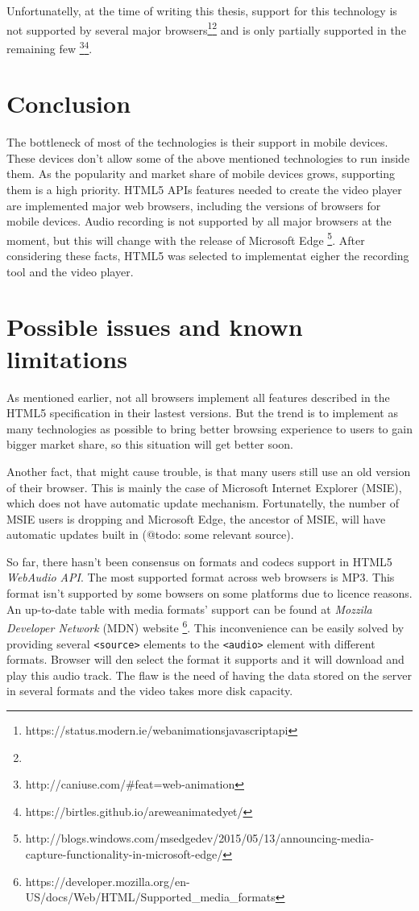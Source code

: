 Unfortunatelly, at the time of writing this thesis, support for this technology is not supported by several major browsers\footnote{https://status.modern.ie/webanimationsjavascriptapi}\footnote{} and is only partially supported in the remaining few \footnote{http://caniuse.com/\#feat=web-animation}\footnote{https://birtles.github.io/areweanimatedyet/}.

\section{Conclusion}
The bottleneck of most of the technologies is their support in mobile devices. These devices don't allow some of the above mentioned technologies to run inside them. As the popularity and market share of mobile devices grows, supporting them is a high priority. HTML5 APIs features needed to create the video player are implemented major web browsers, including the versions of browsers for mobile devices. Audio recording is not supported by all major browsers at the moment, but this will change with the release of Microsoft Edge \cite{}\footnote{http://blogs.windows.com/msedgedev/2015/05/13/announcing-media-capture-functionality-in-microsoft-edge/}. After considering these facts, HTML5 was selected to implementat eigher the recording tool and the video player.

\section{Possible issues and known limitations}
As mentioned earlier, not all browsers implement all features described in the HTML5 specification in their lastest versions. But the trend is to implement as many technologies as possible to bring better browsing experience to users to gain bigger market share, so this situation will get better soon.

Another fact, that might cause trouble, is that many users still use an old version of their browser. This is mainly the case of Microsoft Internet Explorer (MSIE), which does not have automatic update mechanism. Fortunatelly, the number of MSIE users is dropping and Microsoft Edge, the ancestor of MSIE, will have automatic updates built in (@todo: some relevant source).

So far, there hasn't been consensus on formats and codecs support in HTML5 \textit{WebAudio API}. The most supported format across web browsers is MP3. This format isn't supported by some bowsers on some platforms due to licence reasons. An up-to-date table with media formats' support can be found at \textit{Mozzila Developer Network} (MDN) website  \cite{} \footnote{https://developer.mozilla.org/en-US/docs/Web/HTML/Supported\_media\_formats}. This inconvenience can be easily solved by providing several \verb|<source>| elements to the \verb|<audio>| element with different formats. Browser will den select the format it supports and it will download and play this audio track. The flaw is the need of having the data stored on the server in several formats and the video takes more disk capacity.